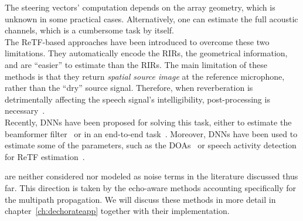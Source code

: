 The steering vectors' computation depends on the array geometry, which is unknown in some practical cases.
Alternatively, one can estimate the full acoustic channels, which is a cumbersome task by itself.
\\The \ac{ReTF}-based approaches have been introduced to overcome these two limitations.
They automatically encode the \acp{RIR}, the geometrical information, and are ``easier'' to estimate than the \acp{RIR}.
The main limitation of these methods is that they return \textit{spatial source image} at the reference microphone, rather than the ``dry'' source signal.
Therefore, when reverberation is detrimentally affecting the speech signal's intelligibility, post-processing is necessary~.
\\Recently, \acp{DNN} have been proposed for solving this task, either to estimate the beamformer filter~ or in an end-to-end task~.
Moreover, \acp{DNN} have been used to estimate some of the parameters, such as the \acp{DOA}~ or speech activity detection for \ac{ReTF} estimation~.

 are neither considered nor modeled as noise terms in the literature discussed thus far.
This direction is taken by the echo-aware methods accounting specifically for the multipath propagation.
We will discuss these methods in more detail in chapter~\cref{ch:dechorateapp} together with their implementation.

